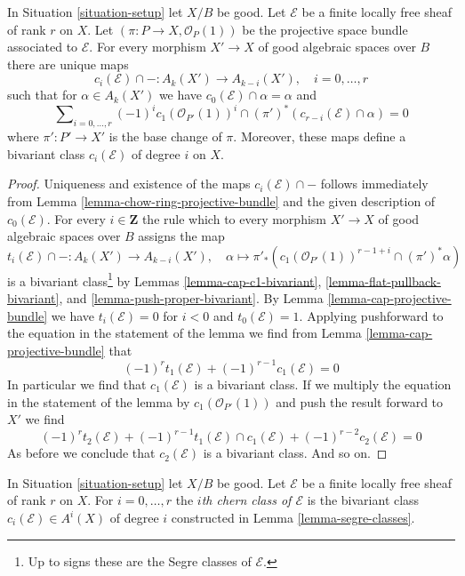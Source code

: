 \begin{lemma}
\label{lemma-segre-classes}
In Situation \ref{situation-setup} let $X/B$ be good.
Let $\mathcal{E}$ be a finite locally free sheaf of rank $r$ on $X$.
Let $(\pi : P \to X, \mathcal{O}_P(1))$ be the projective space
bundle associated to $\mathcal{E}$. For every
morphism $X' \to X$ of good algebraic spaces over $B$
there are unique maps
$$
c_i(\mathcal{E}) \cap - : A_k(X') \longrightarrow A_{k - i}(X'),\quad
i = 0, \ldots, r
$$
such that for $\alpha \in A_k(X')$ we have
$c_0(\mathcal{E}) \cap \alpha = \alpha$ and
$$
\sum\nolimits_{i = 0, \ldots, r}
(-1)^i c_1(\mathcal{O}_{P'}(1))^i \cap
(\pi')^*\left(c_{r - i}(\mathcal{E}) \cap \alpha\right) = 0
$$
where $\pi' : P' \to X'$ is the base change of $\pi$.
Moreover, these maps define a bivariant class
$c_i(\mathcal{E})$ of degree $i$ on $X$.
\end{lemma}

\begin{proof}
Uniqueness and existence of the maps $c_i(\mathcal{E}) \cap -$
follows immediately from Lemma \ref{lemma-chow-ring-projective-bundle}
and the given description of $c_0(\mathcal{E})$. For every $i \in \mathbf{Z}$
the rule which to every morphism $X' \to X$ of good algebraic spaces
over $B$ assigns the map
$$
t_i(\mathcal{E}) \cap - :
A_k(X') \longrightarrow A_{k - i}(X'),\quad
\alpha \longmapsto
\pi'_*(c_1(\mathcal{O}_{P'}(1))^{r - 1 + i} \cap (\pi')^*\alpha)
$$
is a bivariant class\footnote{Up to signs these are
the Segre classes of $\mathcal{E}$.} by Lemmas \ref{lemma-cap-c1-bivariant},
\ref{lemma-flat-pullback-bivariant}, and
\ref{lemma-push-proper-bivariant}.
By Lemma \ref{lemma-cap-projective-bundle} we have
$t_i(\mathcal{E}) = 0$ for $i < 0$ and $t_0(\mathcal{E}) = 1$.
Applying pushforward to the equation in the statement of the lemma
we find from Lemma \ref{lemma-cap-projective-bundle} that
$$
(-1)^r t_1(\mathcal{E}) + (-1)^{r - 1}c_1(\mathcal{E}) = 0
$$
In particular we find that $c_1(\mathcal{E})$ is a bivariant class.
If we multiply the equation in the statement of the lemma by
$c_1(\mathcal{O}_{P'}(1))$ and push the result forward to $X'$
we find
$$
(-1)^r t_2(\mathcal{E}) +
(-1)^{r - 1} t_1(\mathcal{E}) \cap c_1(\mathcal{E}) +
(-1)^{r - 2} c_2(\mathcal{E}) = 0
$$
As before we conclude that $c_2(\mathcal{E})$ is a bivariant class.
And so on.
\end{proof}

\begin{definition}
\label{definition-chern-classes}
In Situation \ref{situation-setup} let $X/B$ be good.
Let $\mathcal{E}$ be a finite locally free sheaf of rank $r$ on $X$.
For $i = 0, \ldots, r$ the {\it $i$th chern class of $\mathcal{E}$}
is the bivariant class $c_i(\mathcal{E}) \in A^i(X)$ of degree $i$
constructed in Lemma \ref{lemma-segre-classes}.
\end{definition}

